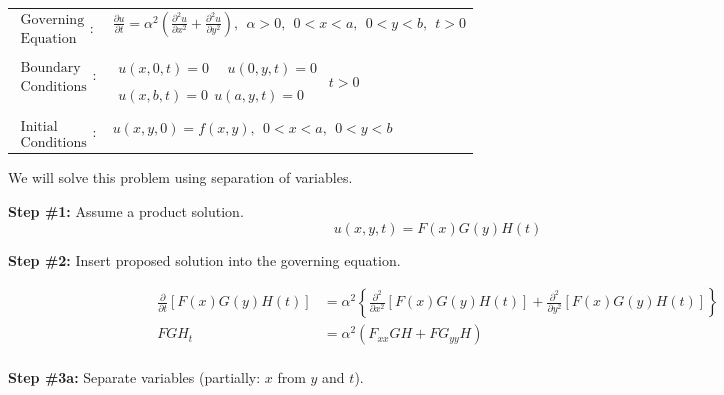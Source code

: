 \begin{table}
\begin{tabular}{l l}
$\substack{\text{Governing} \\\text{Equation}}: $& $\frac{\partial u}{\partial t} = \alpha^2 \left(\frac{\partial^2 u}{\partial x^2} + \frac{\partial^2 u}{\partial y^2}\right),  \ \ \alpha>0, \ \ 0<x<a, \ \ 0<y<b, \ \  t>0$ \\
& \\
$\substack{\text{Boundary} \\ \text{Conditions}}: $ & $\substack{u(x,0,t)=0  \ \ \ \ \ \ u(0,y,t) = 0 \\ \\ u(x,b,t) = 0 \ \ u(a,y,t) = 0} \ \ t>0$ \\
& \\
$\substack{\text{Initial} \\ \text{Conditions}}: $ & $u(x,y,0) = f(x,y), \ \ 0<x<a, \ \ 0<y<b $ 
\end{tabular}
\end{table}

\vspace{0.25cm}

\noindent We will solve this problem using separation of variables.

\vspace{0.25cm}

\noindent\textbf{Step \#1:} Assume a product solution.
\begin{equation*}
u(x,y,t) = F(x)G(y)H(t)
\end{equation*}

\vspace{3.0cm}

\noindent\textbf{Step \#2:} Insert proposed solution into the governing equation.

\begin{align*}
\frac{\partial}{\partial t}\left[F(x)G(y)H(t)\right] &= \alpha^2 \left\{\frac{\partial^2}{\partial x^2}\left[F(x)G(y)H(t)\right] + \frac{\partial^2}{\partial y^2}\left[F(x)G(y)H(t)\right] \right\} \\
FGH_t &= \alpha^2\left(F_{xx}GH + FG_{yy}H\right) \\
\end{align*}

\vspace{0.25cm}

\noindent\textbf{Step \#3a:} Separate variables (partially: $x$ from $y$ and $t$).

